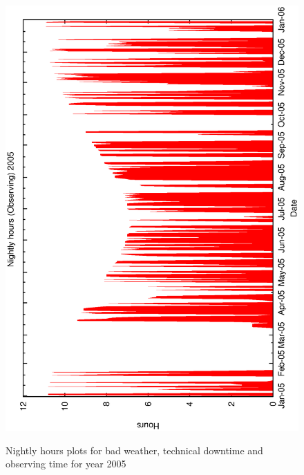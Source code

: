 \begin{figure}[h]
\begin{center}
{    \includegraphics[scale=0.4, angle=-90]{figures/met_nightly_stats_obs2005.eps}
  }
\caption{Nightly hours plots for bad weather, technical downtime and observing time for year 2005}
\end{center}
\end{figure}


